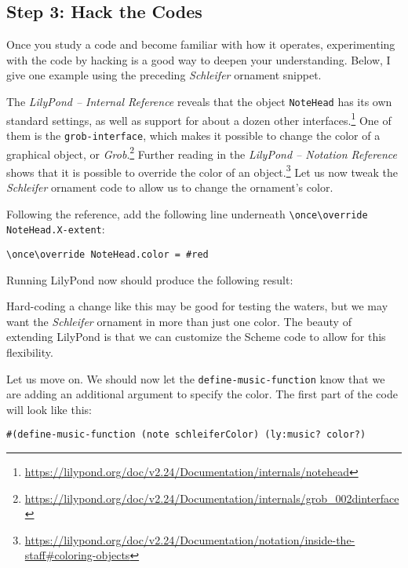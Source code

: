 \subsection {Step 3: Hack the Codes}

Once you study a code and become familiar with how it operates, experimenting with the code by hacking is a good way to deepen your understanding. Below, I give one example using the preceding \textit{Schleifer} ornament snippet.

The \textit{LilyPond -- Internal Reference} reveals that the object \verb+NoteHead+ has its own standard settings, as well as support for about a dozen other interfaces.\footnote{\url{https://lilypond.org/doc/v2.24/Documentation/internals/notehead}} One of them is the \verb+grob-interface+, which makes it possible to change the color of a graphical object, or \textit{Grob}.\footnote{\url{https://lilypond.org/doc/v2.24/Documentation/internals/grob_002dinterface}} Further reading in the \textit{LilyPond -- Notation Reference} shows that it is possible to override the color of an object.\footnote{\url{https://lilypond.org/doc/v2.24/Documentation/notation/inside-the-staff#coloring-objects}} Let us now tweak the \textit{Schleifer} ornament code to allow us to change the ornament's color.

Following the reference, add the following line underneath \verb+\once\override NoteHead.X-extent+:

\begin{verbatim}
\once\override NoteHead.color = #red
\end{verbatim}

Running LilyPond now should produce the following result:

\hfill \break 

Hard-coding a change like this may be good for testing the waters, but we may want the \textit{Schleifer} ornament in more than just one color. The beauty of extending LilyPond is that we can customize the Scheme code to allow for this flexibility.

Let us move on. We should now let the \verb+define-music-function+ know that we are adding an additional argument to specify the color. The first part of the code will look like this:

\begin{verbatim}
#(define-music-function (note schleiferColor) (ly:music? color?) 
\end{verbatim}

